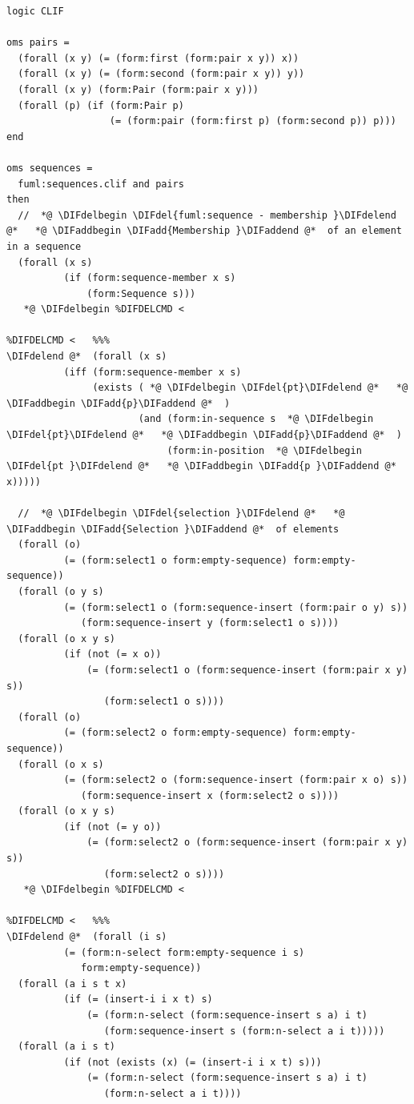 \documentclass[10pt,fleqn,final]{scrreprt}
\providecommand{\DIFadd}[1]{{\protect\color{blue}\uwave{#1}}} %
\providecommand{\DIFdel}[1]{{\protect\color{red}\sout{#1}}}                      %
\providecommand{\DIFaddbegin}{} %
\providecommand{\DIFaddend}{} %
\providecommand{\DIFdelbegin}{} %
\providecommand{\DIFdelend}{} %
\begin{document}
\begin{lstlisting}[language=clif,morekeywords={then,with,logic,oms,end},mathescape]
logic CLIF

oms pairs =
  (forall (x y) (= (form:first (form:pair x y)) x))
  (forall (x y) (= (form:second (form:pair x y)) y))
  (forall (x y) (form:Pair (form:pair x y)))
  (forall (p) (if (form:Pair p)
                  (= (form:pair (form:first p) (form:second p)) p)))
end

oms sequences =
  fuml:sequences.clif and pairs
then
  //  *@ \DIFdelbegin \DIFdel{fuml:sequence - membership }\DIFdelend @*   *@ \DIFaddbegin \DIFadd{Membership }\DIFaddend @*  of an element in a sequence
  (forall (x s)
          (if (form:sequence-member x s)
              (form:Sequence s)))
   *@ \DIFdelbegin %DIFDELCMD < 

%DIFDELCMD <   %%%
\DIFdelend @*  (forall (x s)
          (iff (form:sequence-member x s)
               (exists ( *@ \DIFdelbegin \DIFdel{pt}\DIFdelend @*   *@ \DIFaddbegin \DIFadd{p}\DIFaddend @*  ) 
                       (and (form:in-sequence s  *@ \DIFdelbegin \DIFdel{pt}\DIFdelend @*   *@ \DIFaddbegin \DIFadd{p}\DIFaddend @*  )
                            (form:in-position  *@ \DIFdelbegin \DIFdel{pt }\DIFdelend @*   *@ \DIFaddbegin \DIFadd{p }\DIFaddend @*  x)))))

  //  *@ \DIFdelbegin \DIFdel{selection }\DIFdelend @*   *@ \DIFaddbegin \DIFadd{Selection }\DIFaddend @*  of elements
  (forall (o)
          (= (form:select1 o form:empty-sequence) form:empty-sequence))
  (forall (o y s)
          (= (form:select1 o (form:sequence-insert (form:pair o y) s)) 
             (form:sequence-insert y (form:select1 o s))))
  (forall (o x y s)
          (if (not (= x o))
              (= (form:select1 o (form:sequence-insert (form:pair x y) s)) 
                 (form:select1 o s))))
  (forall (o)
          (= (form:select2 o form:empty-sequence) form:empty-sequence))
  (forall (o x s)
          (= (form:select2 o (form:sequence-insert (form:pair x o) s)) 
             (form:sequence-insert x (form:select2 o s))))
  (forall (o x y s)
          (if (not (= y o))
              (= (form:select2 o (form:sequence-insert (form:pair x y) s)) 
                 (form:select2 o s))))
   *@ \DIFdelbegin %DIFDELCMD < 

%DIFDELCMD <   %%%
\DIFdelend @*  (forall (i s)
          (= (form:n-select form:empty-sequence i s) 
             form:empty-sequence))
  (forall (a i s t x)
          (if (= (insert-i i x t) s)
              (= (form:n-select (form:sequence-insert s a) i t)
                 (form:sequence-insert s (form:n-select a i t)))))
  (forall (a i s t)
          (if (not (exists (x) (= (insert-i i x t) s)))
              (= (form:n-select (form:sequence-insert s a) i t)
                 (form:n-select a i t))))


\end{lstlisting}
\end{document}

